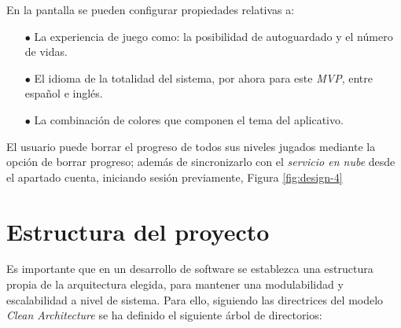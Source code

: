En la pantalla se pueden configurar propiedades relativas a: 

\begin{itemize}
  \item[$\bullet$] La experiencia de juego como: la posibilidad de autoguardado y
  el número de vidas.
  \item[$\bullet$] El idioma de la totalidad del sistema, por ahora para este \textit{MVP}, entre español e inglés.
  \item[$\bullet$] La combinación de colores que componen el tema del aplicativo.
\end{itemize}

El usuario puede borrar el progreso de todos sus niveles jugados mediante la opción de borrar
progreso; además de sincronizarlo con el \textit{servicio en nube} desde el apartado cuenta, 
iniciando sesión previamente, Figura \ref{fig:design-4}

\section{Estructura del proyecto}
Es importante que en un desarrollo de software se establezca una estructura propia de la arquitectura elegida,
para mantener una modulabilidad y escalabilidad a nivel de sistema.
Para ello, siguiendo las directrices del modelo \textit{Clean Architecture} se ha definido el siguiente
árbol de directorios:


